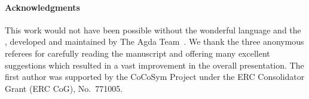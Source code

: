 \paragraph*{Acknowledgments}
This work would not have been possible without the wonderful \agda language and
the \agdastdlib, developed and maintained by The Agda Team~\cite{agdastdlib}.
We thank the three anonymous referees for carefully reading the manuscript and
offering many excellent suggestions which resulted in a vast improvement in the overall presentation.
The first author was supported by the CoCoSym Project under the ERC
Consolidator Grant (ERC CoG), No.~771005.




